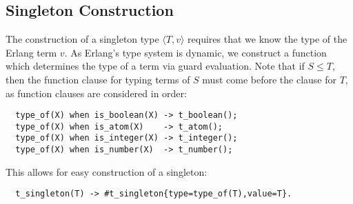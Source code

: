 \documentclass[nonacm,timestamp,manuscript]{acmart}
\newcommand{\singleton}[2]{\langle #1, #2 \rangle} %
\newcommand{\singletonex}{\singleton{T}{v}}
\begin{document}
\subsection{Singleton Construction}

The construction of a singleton type $\singletonex$ requires that we know the
type of the Erlang term $v$. As Erlang's type system is dynamic, we construct
a function which determines the type of a term via guard evaluation. Note that if
$S \le T$, then the function clause for typing terms of $S$ must come before the
clause for $T$, as function clauses are considered in order:

\begin{verbatim}
  type_of(X) when is_boolean(X) -> t_boolean();
  type_of(X) when is_atom(X)    -> t_atom();
  type_of(X) when is_integer(X) -> t_integer();
  type_of(X) when is_number(X)  -> t_number();
\end{verbatim}

This allows for easy construction of a singleton:
\begin{verbatim}
  t_singleton(T) -> #t_singleton{type=type_of(T),value=T}.
\end{verbatim}




\end{document}
